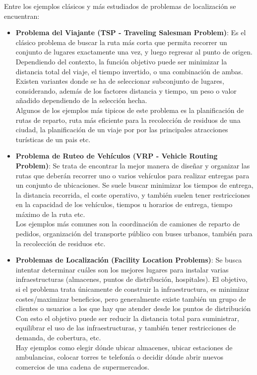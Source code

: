 \documentclass[12pt,a4paper]{book}
\begin{document}
Entre los ejemplos clásicos y más estudiados de problemas de localización se encuentran:

\begin{itemize}
    \item \textbf{Problema del Viajante (TSP - Traveling Salesman Problem)}: Es el clásico problema de buscar la ruta más corta que permita recorrer un conjunto de lugares exactamente una vez, y luego regresar al punto de origen. Dependiendo del contexto, la función objetivo puede ser minimizar la distancia total del viaje, el tiempo invertido, o una combinación de ambas.\\
Existen variantes donde se ha de seleccionar subconjunto de lugares, considerando, además de los factores distancia y tiempo, un peso o valor añadido dependiendo de la selección hecha.\\
Algunos de los ejemplos más tipicos de este problema es la planificación de rutas de reparto, ruta más eficiente para la recolección de residuos de una ciudad, la planificación de un viaje por por las principales atracciones turísticas de un pais etc.

    \item \textbf{Problema de Ruteo de Vehículos (VRP - Vehicle Routing Problem)}: Se trata de encontrar la mejor manera de diseñar y organizar las rutas que deberán recorrer uno o varios vehículos para realizar entregas para un conjunto de ubicaciones. Se suele buscar minimizar los tiempos de entrega, la distancia recorrida, el coste operativo, y también suelen tener restricciones 
en la capacidad de los vehículos, tiempos u horarios de entrega, tiempo máximo de la ruta etc.\\
Los ejemplos más comunes son la coordinación de camiones de reparto de pedidos, organización del transporte público con buses urbanos, también para la recolección de residuos etc.
    \item \textbf{Problemas de Localización (Facility Location Problems)}: Se busca intentar determinar cuáles son los mejores lugares para instalar varias infraestructuras (almacenes, puntos de distribución, hospitales). El objetivo, si el problema trata únicamente de construir la infraestructura, es minimizar costes/maximizar beneficios, pero generalmente existe también un grupo de clientes o usuarios a los que hay que atender desde los puntos de distribución Con esto el objetivo puede ser reducir la distancia total para suministrar, equilibrar
el uso de las infraestructuras, y también tener restricciones de demanda, de cobertura, etc.\\
Hay ejemplos como elegir dónde ubicar almacenes, ubicar estaciones de ambulancias, colocar torres te telefonía o decidir dónde abrir nuevos comercios de una cadena de supermercados.
\end{itemize}
\end{document}
